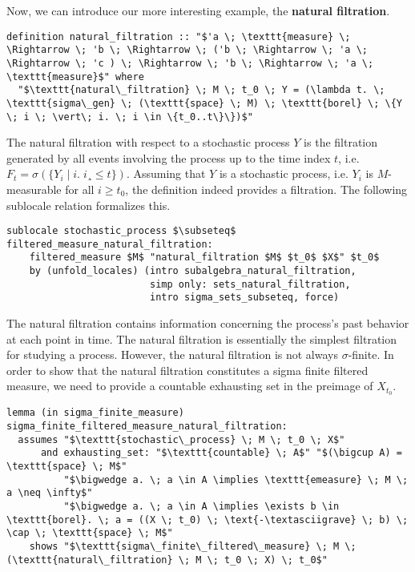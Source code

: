 Now, we can introduce our more interesting example, the \textbf{natural filtration}.

\begin{isadefinition}
{\small
\begin{lstlisting}[style=isabelle]
definition natural_filtration :: "$'a \; \texttt{measure} \; \Rightarrow \; 'b \; \Rightarrow \; ('b \; \Rightarrow \; 'a \; \Rightarrow \; 'c ) \; \Rightarrow \; 'b \; \Rightarrow \; 'a \; \texttt{measure}$" where
  "$\texttt{natural\_filtration} \; M \; t_0 \; Y = (\lambda t. \; \texttt{sigma\_gen} \; (\texttt{space} \; M) \; \texttt{borel} \; \{Y \; i \; \vert\; i. \; i \in \{t_0..t\}\})$"
\end{lstlisting}
}
\end{isadefinition}
The natural filtration with respect to a stochastic process $Y$ is the filtration generated by all events involving the process up to the time index $t$, i.e. $F_t = \sigma(\{Y_i \; \vert\; i. \; i¸ \le t\})$. Assuming that $Y$ is a stochastic process, i.e. $Y_i$ is $M$-measurable for all $i \ge t_0$, the definition indeed provides a filtration. The following sublocale relation formalizes this.

\begin{isalemma}
{\small
\begin{lstlisting}[style=isabelle]
sublocale stochastic_process $\subseteq$ filtered_measure_natural_filtration: 
	filtered_measure $M$ "natural_filtration $M$ $t_0$ $X$" $t_0$
    by (unfold_locales) (intro subalgebra_natural_filtration, 
						 simp only: sets_natural_filtration, 
						 intro sigma_sets_subseteq, force) 
\end{lstlisting}
}
\end{isalemma}

The natural filtration contains information concerning the process's past behavior at each point in time. The natural filtration is essentially the simplest filtration for studying a process. However, the natural filtration is not always $\sigma$-finite. In order to show that the natural filtration constitutes a sigma finite filtered measure, we need to provide a countable exhausting set in the preimage of $X_{t_0}$.

\begin{isalemma}
{\small
\begin{lstlisting}[style=isabelle]
lemma (in sigma_finite_measure) sigma_finite_filtered_measure_natural_filtration:
  assumes "$\texttt{stochastic\_process} \; M \; t_0 \; X$"
      and exhausting_set: "$\texttt{countable} \; A$" "$(\bigcup A) = \texttt{space} \; M$" 
		  "$\bigwedge a. \; a \in A \implies \texttt{emeasure} \; M \; a \neq \infty$" 
		  "$\bigwedge a. \; a \in A \implies \exists b \in \texttt{borel}. \; a = ((X \; t_0) \; \text{-\textasciigrave} \; b) \; \cap \; \texttt{space} \; M$"
    shows "$\texttt{sigma\_finite\_filtered\_measure} \; M \; (\texttt{natural\_filtration} \; M \; t_0 \; X) \; t_0$"
\end{lstlisting}
}
\end{isalemma}

